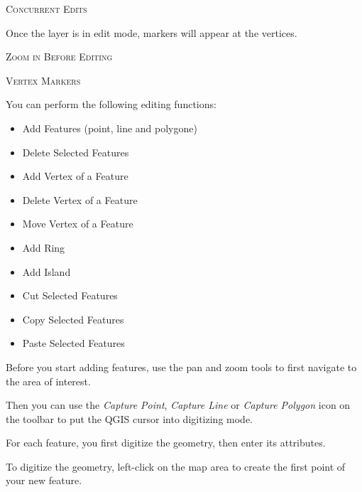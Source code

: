 \begin{Tip}[h]\caption{\textsc{Concurrent Edits}}
\end{Tip}

Once the layer is in edit mode, markers will appear at the
vertices.

\begin{Tip}[h]\caption{\textsc{Zoom in Before Editing}}
\end{Tip}

\begin{Tip}[h]\caption{\textsc{Vertex Markers}}
\end{Tip}

You can perform the following editing functions:

\begin{itemize}
\item Add Features (point, line and polygone)
\item Delete Selected Features
\item Add Vertex of a Feature
\item Delete Vertex of a Feature
\item Move Vertex of a Feature
\item Add Ring
\item Add Island
\item Cut Selected Features
\item Copy Selected Features
\item Paste Selected Features
\end{itemize}


Before you start adding features, use the pan
and zoom tools to first navigate to the area of interest.

Then you can use the \textit{Capture Point}, \textit{Capture Line} 
or \textit{Capture Polygon} icon on the toolbar to put the QGIS cursor
into digitizing mode.

For each feature, you first digitize the geometry, then enter its attributes.

To digitize the geometry, left-click on the map area to create the
first point of your new feature.

